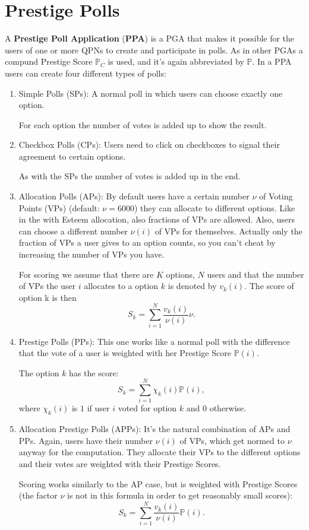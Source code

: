 \documentclass[a4paper,12pt]{scrartcl}
\newcounter{formula}
\begin{document}
\section{Prestige Polls}
A \textbf{Prestige Poll Application} (\textbf{PPA}) is a PGA that makes it possible for the users of one or more QPNs to create and participate in polls. As in other PGAs a compund Prestige Score $\mathbb{P}_C$ is used, and it's again abbreviated by $\mathbb{P}$. In a PPA users can create four different types of polls:
\begin{enumerate}
 \item Simple Polls (SPs): A normal poll in which users can choose exactly one option.
 
 For each option the number of votes is added up to show the result.
 \item Checkbox Polls (CPs): Users need to click on checkboxes to signal their agreement to certain options.
 
 As with the SPs the number of votes is added up in the end.
 \item Allocation Polls (APs): By default users have a certain number $\nu$ of Voting Points (VPs) (default: $\nu = 6000$) they can allocate to different options. Like in the with Esteem allocation, also fractions of VPs are allowed. Also, users can choose a different number $\nu(i)$ of VPs for themselves. Actually only the fraction of VPs a user gives to an option counts, so you can't cheat by increasing the number of VPs you have.
 
 For scoring we assume that there are $K$ options, $N$ users and that the number of VPs the user $i$ allocates to a option $k$ is denoted by $v_k(i)$. The score of option k is then
 $$S_k = \sum_{i=1}^N \frac{v_k(i)}{\nu(i)} \nu.$$
 
 \item Prestige Polls (PPs): This one works like a normal poll with the difference that the vote of a user is weighted with her Prestige Score $\mathbb{P}(i)$.
 
 The option $k$ has the score:
 $$S_k = \sum_{i=1}^N \chi_k(i) \mathbb{P}(i),$$
 where $\chi_k(i)$ is $1$ if user $i$ voted for option $k$ and $0$ otherwise.
 \item Allocation Prestige Polls (APPs): It's the natural combination of APs and PPs. Again, users have their number $\nu(i)$ of VPs, which get normed to $\nu$ anyway for the computation. They allocate their VPs to the different options and their votes are weighted with their Prestige Scores.
 
 Scoring works similarly to the AP case, but is weighted with Prestige Scores (the factor $\nu$ is not in this formula in order to get reasonably small scores):
$$S_k = \sum_{i=1}^N \frac{v_k(i)}{\nu(i)} \mathbb{P}(i).$$
\end{enumerate}
\end{document}
